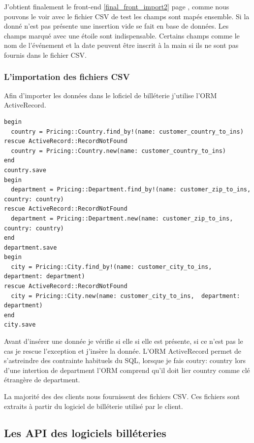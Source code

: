 J'obtient finalement le front-end \ref{final_front_import2} page \pageref{final_front_import2}, comme nous pouvons le voir avec le fichier CSV de test les champs sont mapés ensemble. Si la donné n'est pas présente une insertion vide se fait en base de données. Les champs marqué avec une étoile sont indispensable. Certains champs comme le nom de l'événement et la date peuvent être inscrit à la main si ils ne sont pas fournis dans le fichier CSV.


\subsubsection{L'importation des fichiers CSV}

Afin d'importer les données dans le loficiel de billéterie j'utilise l'ORM ActiveRecord.

\lstset{style=customruby}
\begin{lstlisting}
begin
  country = Pricing::Country.find_by!(name: customer_country_to_ins)
rescue ActiveRecord::RecordNotFound 
  country = Pricing::Country.new(name: customer_country_to_ins)
end
country.save
begin
  department = Pricing::Department.find_by!(name: customer_zip_to_ins, country: country)
rescue ActiveRecord::RecordNotFound
  department = Pricing::Department.new(name: customer_zip_to_ins,  country: country)
end
department.save
begin
  city = Pricing::City.find_by!(name: customer_city_to_ins, department: department)
rescue ActiveRecord::RecordNotFound
  city = Pricing::City.new(name: customer_city_to_ins,  department: department)
end
city.save
\end{lstlisting}
\leavevmode 

Avant d'insérer une donnée je vérifie si elle si elle est présente, si ce n'est pas le cas je rescue l'exception et j'insère la donnée. 
L'ORM ActiveRecord permet de s'astreindre des contrainte habituels du SQL, lorsque je fais coutry: country lors d'une intertion de department l'ORM comprend qu'il doit lier country comme clé étrangère de department.

La majorité des des clients nous fournissent des fichiers CSV. Ces fichiers sont extraits à partir du logiciel de billéterie utilisé par le client.


\subsection{Les API des logiciels billéteries}

















